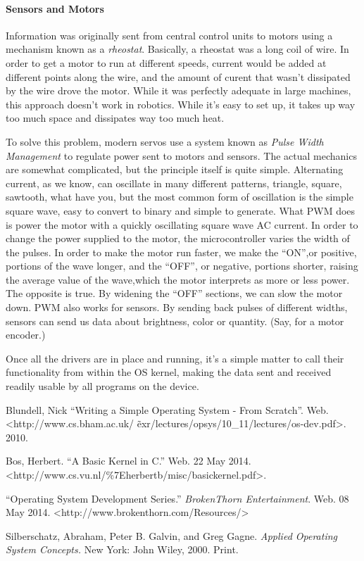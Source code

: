 \documentclass[english]{paper}
\begin{document}
\paragraph{Sensors and Motors}
Information was originally sent from central control units to motors using a mechanism known as a {\it rheostat}. Basically, a rheostat was a long coil of wire. In order to get a motor to run at different speeds, current would be added at different points along the wire, and the amount of curent that wasn't dissipated by the wire drove the motor. While it was perfectly adequate in large machines, this approach doesn't work in robotics. While it's easy to set up, it takes up way too much space and dissipates way too much heat. 

To solve this problem, modern servos use a system known as {\it Pulse Width Management} to regulate power sent to motors and sensors. The actual mechanics are somewhat complicated, but the principle itself is quite simple. Alternating current, as we know, can oscillate in many different patterns, triangle, square, sawtooth, what have you, but the most common form of oscillation is the simple square wave, easy to convert to binary and simple to generate. What PWM does is power the motor with a quickly oscillating square wave AC current. In order to change the power supplied to the motor, the microcontroller varies the width of the pulses. In order to make the motor run faster, we make the ``ON'',or positive, portions of the wave longer, and the ``OFF'', or negative, portions shorter, raising the average value of the wave,which the motor interprets as more or less power. The opposite is true. By widening the ``OFF'' sections, we can slow the motor down. PWM also works for sensors. By sending back pulses of different widths, sensors can send us data about brightness, color or quantity. (Say, for a motor encoder.)

Once all the drivers are in place and running, it's a simple matter to call their functionality from within the OS kernel, making the data sent and received readily usable by all programs on the device.

\newpage

\begin{thebibliography}{1}

 Blundell, Nick ``Writing a Simple Operating System - From Scratch''. Web. <http://www.cs.bham.ac.uk/ \~ exr/lectures/opsys/10\_11/lectures/os-dev.pdf>. 2010.

  Bos, Herbert. ``A Basic Kernel in C.'' Web. 22 May 2014. <http://www.cs.vu.nl/\%7Eherbertb/misc/basickernel.pdf>.

 ``Operating System Development Series.'' {\em BrokenThorn Entertainment}. Web. 08 May 2014. <http://www.brokenthorn.com/Resources/>

 Silberschatz, Abraham, Peter B. Galvin, and Greg Gagne. \textit{Applied Operating System Concepts.} New York: John Wiley, 2000. Print.

\end{thebibliography}
\end{document}
